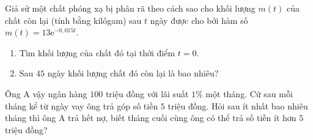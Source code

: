 \begin{ex}%
	Giả sử một chất phóng xạ bị phân rã theo cách sao cho khối lượng $m(t)$ của chất còn lại (tính bằng kilôgam) sau $t$ ngày được cho bởi hàm  số $m(t)=13\mathrm{e}^{-0{,}015t}$.
	\begin{enumerate}
		\item Tìm  khối lượng của chất đó tại thời điểm $t=0$.
		\item Sau $45$ ngày khối lượng chất đó còn lại là bao  nhiêu?
	\end{enumerate}
\end{ex}

\begin{ex}%
	Ông A vậy ngân hàng $100$ triệu đồng với lãi suất $1\%$ một tháng. Cứ sau mỗi tháng kể từ ngày vay ông trả góp số tiền $5$ triệu đồng. Hỏi sau ít nhất bao nhiêu tháng thì ông A trả hết nợ, biết tháng cuối cùng ông có thể trả số tiền  ít hơn $5$ triệu đồng?
\end{ex}

